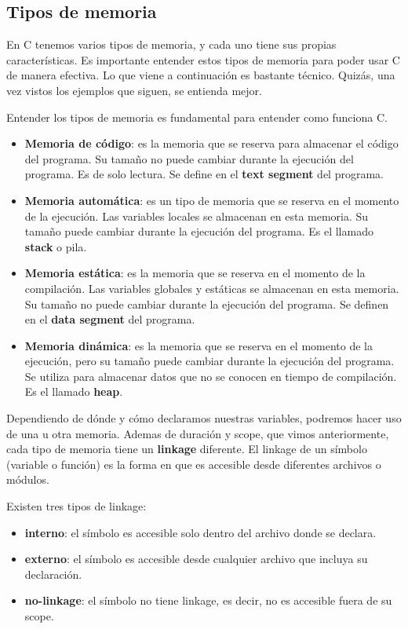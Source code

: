 \documentclass[]{scrartcl}
\begin{document}
\subsection*{Tipos de memoria}

En C tenemos varios tipos de memoria, y cada uno tiene sus propias características. Es importante entender estos tipos de memoria para poder usar C de manera efectiva. Lo que viene a continuación es bastante técnico. Quizás, una vez vistos los ejemplos que siguen, se entienda mejor.

\begin{importantbox}
  Entender los tipos de memoria es fundamental para entender como funciona C.
\end{importantbox}

\begin{itemize}
  \item \textbf{Memoria de código}: es la memoria que se reserva para almacenar el código del programa. Su tamaño no puede cambiar durante la ejecución del programa. Es de solo lectura. Se define en el \textbf{text segment} del programa.
  \item \textbf{Memoria automática}: es un tipo de memoria que se reserva en el momento de la ejecución. Las variables locales se almacenan en esta memoria. Su tamaño puede cambiar durante la ejecución del programa. Es el llamado \textbf{stack} o pila.
    \item \textbf{Memoria estática}: es la memoria que se reserva en el momento de la compilación. Las variables globales y estáticas se almacenan en esta memoria. Su tamaño no puede cambiar durante la ejecución del programa. Se definen en el \textbf{data segment} del programa.
    \item \textbf{Memoria dinámica}: es la memoria que se reserva en el momento de la ejecución, pero su tamaño puede cambiar durante la ejecución del programa. Se utiliza para almacenar datos que no se conocen en tiempo de compilación. Es el llamado \textbf{heap}.
  \end{itemize}
  
Dependiendo de dónde y cómo declaramos nuestras variables, podremos hacer uso de una u otra memoria. Ademas de duración y scope, que vimos anteriormente, cada tipo de memoria tiene un \textbf{linkage} diferente. El linkage de un símbolo (variable o función) es la forma en que es  accesible desde diferentes archivos o módulos. 

Existen tres tipos de linkage:
\begin{itemize}
  \item \textbf{interno}: el símbolo es accesible solo dentro del archivo donde se declara.
  \item \textbf{externo}: el símbolo es accesible desde cualquier archivo que incluya su declaración.
  \item \textbf{no-linkage}: el símbolo no tiene linkage, es decir, no es accesible fuera de su scope.
\end{itemize}
\end{document}
